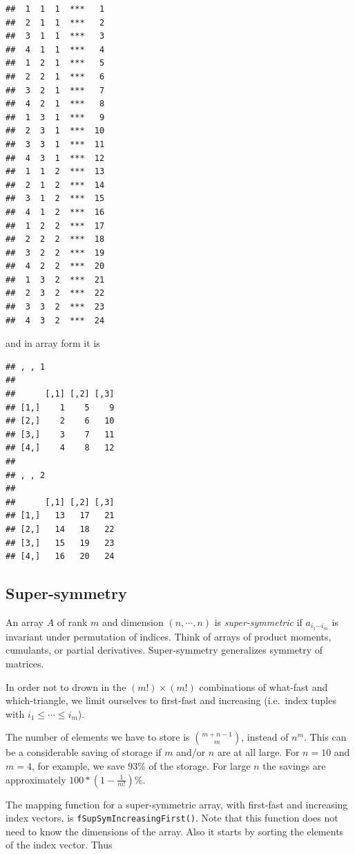 \documentclass[12pt,]{article}
\begin{document}
\begin{verbatim}
##  1  1  1  ***   1 
##  2  1  1  ***   2 
##  3  1  1  ***   3 
##  4  1  1  ***   4 
##  1  2  1  ***   5 
##  2  2  1  ***   6 
##  3  2  1  ***   7 
##  4  2  1  ***   8 
##  1  3  1  ***   9 
##  2  3  1  ***  10 
##  3  3  1  ***  11 
##  4  3  1  ***  12 
##  1  1  2  ***  13 
##  2  1  2  ***  14 
##  3  1  2  ***  15 
##  4  1  2  ***  16 
##  1  2  2  ***  17 
##  2  2  2  ***  18 
##  3  2  2  ***  19 
##  4  2  2  ***  20 
##  1  3  2  ***  21 
##  2  3  2  ***  22 
##  3  3  2  ***  23 
##  4  3  2  ***  24
\end{verbatim}

and in array form it is

\begin{verbatim}
## , , 1
## 
##      [,1] [,2] [,3]
## [1,]    1    5    9
## [2,]    2    6   10
## [3,]    3    7   11
## [4,]    4    8   12
## 
## , , 2
## 
##      [,1] [,2] [,3]
## [1,]   13   17   21
## [2,]   14   18   22
## [3,]   15   19   23
## [4,]   16   20   24
\end{verbatim}

\subsection{Super-symmetry}\label{super-symmetry}

An array \(A\) of rank \(m\) and dimension \((n,\cdots,n)\) is
\emph{super-symmetric} if \(a_{i_1\cdots i_m}\) is invariant under
permutation of indices. Think of arrays of product moments, cumulants,
or partial derivatives. Super-symmetry generalizes symmetry of matrices.

In order not to drown in the \((m!)\times (m!)\) combinations of
what-fast and which-triangle, we limit ourselves to first-fast and
increasing (i.e.~index tuples with \(i_1\leq\cdots\leq i_m\)).

The number of elements we have to store is \(\binom{m+n-1}{m}\), instead
of \(n^m\). This can be a considerable saving of storage if \(m\) and/or
\(n\) are at all large. For \(n=10\) and \(m=4\), for example, we save
\(93\%\) of the storage. For large \(n\) the savings are approximately
\(100*(1-\frac{1}{m!})\%\).

The mapping function for a super-symmetric array, with first-fast and
increasing index vectors, is \texttt{fSupSymIncreasingFirst()}. Note
that this function does not need to know the dimensions of the array.
Also it starts by sorting the elements of the index vector. Thus
\end{document}
